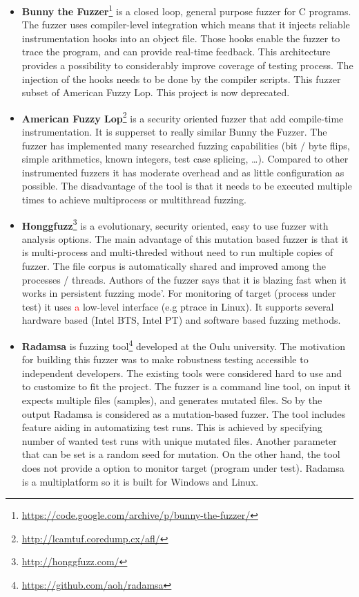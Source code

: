 \begin{itemize}

	\item \textbf{Bunny the Fuzzer}\footnote{\url{https://code.google.com/archive/p/bunny-the-fuzzer/}} is a closed loop, general purpose fuzzer for C programs.
	The fuzzer uses compiler-level integration which means that it injects reliable instrumentation hooks into an object file.
	Those hooks enable the fuzzer to trace the program, and can provide real-time feedback. This architecture provides a possibility
	to considerably improve coverage of testing process. The injection of the hooks
	needs to be done by the compiler scripts.
	This fuzzer subset of American Fuzzy Lop. This project is now deprecated.

	\item \textbf{American Fuzzy Lop}\footnote{\url{http://lcamtuf.coredump.cx/afl/}}
	is a security oriented fuzzer that add compile-time instrumentation. It is
	supperset to really similar Bunny the Fuzzer. The fuzzer has implemented many
	researched fuzzing capabilities (bit / byte flips,  simple arithmetics, known
	integers, test case splicing, \ldots). Compared to other instrumented fuzzers it
	has moderate overhead and as little configuration as possible. The disadvantage
	of the tool is that it needs to be executed multiple times to achieve
	multiprocess or multithread fuzzing.

	\item \textbf{Honggfuzz}\footnote{\url{http://honggfuzz.com/}} is a evolutionary, security oriented, easy to use fuzzer with analysis options.
	The main advantage of this mutation based fuzzer is that it is multi-process and multi-threded without need to run multiple copies of fuzzer.
	The file corpus is automatically shared and improved among the processes / threads.
	Authors of the fuzzer says that it is blazing fast when it works in persistent fuzzing mode'.
	For monitoring of target (process under test) it uses {\textcolor{red}{a}} low-level interface (e.g ptrace in Linux).
	It supports several hardware based (Intel BTS, Intel PT) and software based fuzzing methods.

	\item \textbf{Radamsa} is fuzzing tool\footnote{\url{https://github.com/aoh/radamsa}} developed at the Oulu university.
	The motivation for building this fuzzer was to make robustness testing accessible to independent developers.
	The existing tools were considered hard to use and to customize to fit the project.
	The fuzzer is a command line tool, on input it expects multiple files (samples), and generates mutated files.
	So by the output Radamsa is considered as a mutation-based fuzzer.
	The tool includes feature aiding in automatizing test runs.
	This is achieved by specifying number of wanted test runs with unique mutated files.
	Another parameter that can be set is a random seed for mutation.
	On the other hand, the tool does not provide a option to monitor target (program under test).
	Radamsa is a multiplatform so it is built for Windows and Linux.\cite{radamsaThesis}


\end{itemize}
